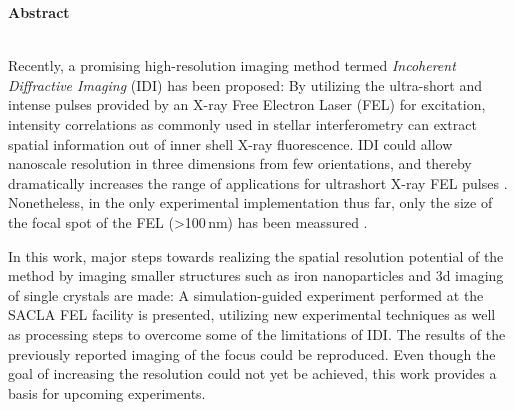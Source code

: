 	\begin{Huge}
		\textbf{Abstract}\vspace{12mm}
	\end{Huge}
\\
Recently, a promising high-resolution imaging method termed \textit{Incoherent Diffractive Imaging} (IDI) has been proposed: By utilizing the ultra-short and intense pulses provided by an X-ray Free Electron Laser (FEL) for excitation,  intensity correlations as commonly used in stellar interferometry can extract spatial information out of inner shell X-ray fluorescence.  IDI could allow nanoscale resolution in three dimensions from few orientations, and thereby dramatically increases the range of applications for ultrashort X-ray FEL pulses \cite{classen2017}. Nonetheless, in the only experimental implementation thus far, only the size of the focal spot of the FEL (>100\,nm) has been meassured \cite{nakumura2020}.

In this work, major steps towards realizing the spatial resolution potential of the method by imaging smaller structures such as iron nanoparticles and 3d imaging of single crystals are made: A simulation-guided experiment performed at the SACLA FEL facility is presented, utilizing new experimental techniques as well as processing steps to overcome some of the limitations of IDI. 
The results of the previously reported imaging of the focus could be reproduced. 
Even though the goal of increasing the resolution could not yet be achieved, this work provides a basis for upcoming experiments.

 \vspace{1cm}
 
